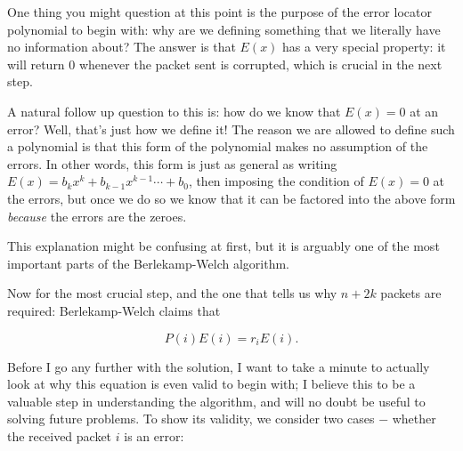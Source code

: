 \documentclass[10pt]{article}
\begin{document}
    \begin{guidance*}{}{}
        One thing you might question at this point is the purpose of the error locator polynomial to begin with: why are we defining something that we literally have no information about? The answer is that $E(x)$ has a very special property: it will return 0 whenever the packet sent is corrupted, which is crucial in the next step. 

        A natural follow up question to this is: how do we know that $E(x) = 0$ at an error? Well, that's just how we define it! The reason we are allowed to define such a polynomial is that this form of the polynomial makes no assumption of the errors. In other words, this form is just as general as writing $E(x) = b_kx^k + b_{k-1}x^{k-1}\cdots + b_0$, then imposing the condition of $E(x) = 0$ at the errors, but once we do so we know that it can be factored into the above form \textit{because} the errors are the zeroes.

        This explanation might be confusing at first, but it is arguably one of the most important parts of the Berlekamp-Welch algorithm.
    \end{guidance*}
    

    Now for the most crucial step, and the one that tells us why $n+2k$ packets are required: Berlekamp-Welch claims that 

    \[ P(i)E(i) = r_iE(i).\] 
    
    
    Before I go any further with the solution, I want to take a minute to actually look at why this equation is even valid to begin with; I believe this to be a valuable step in understanding the algorithm, and will no doubt be useful to solving future problems. To show its validity, we consider two cases $-$ whether the received packet $i$ is an error:
    
\end{document}
